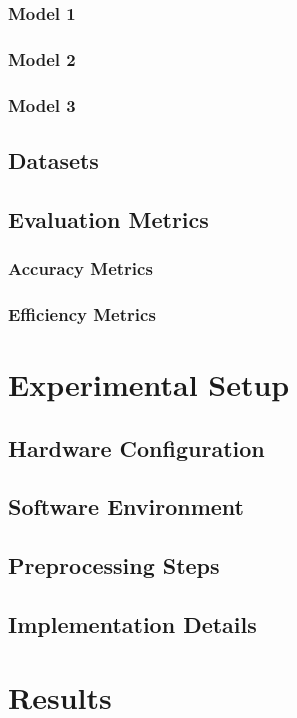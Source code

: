 \documentclass[12pt,a4paper]{article}
\begin{document}
\subsubsection{Model 1}
\subsubsection{Model 2}
\subsubsection{Model 3}
\subsection{Datasets}
\subsection{Evaluation Metrics}
\subsubsection{Accuracy Metrics}
\subsubsection{Efficiency Metrics}

\section{Experimental Setup}
\subsection{Hardware Configuration}
\subsection{Software Environment}
\subsection{Preprocessing Steps}
\subsection{Implementation Details}

\section{Results}
\end{document}
